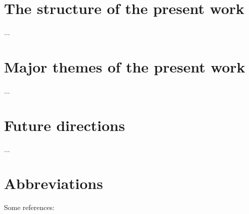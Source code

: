 \documentclass[output=paper]{langsci/langscibook}
\begin{document}
\section{The structure of the present work}\label{introstructure}
...

\section{Major themes of the present work}\label{introthemes}
...

\section{Future directions}\label{introfuture}
...

\section*{Abbreviations}

Some references:\\
\\
\citet{Jastrow2002}\\
\citet{Owens2000editor}\\
\citet{Watson2011dialectsoverview}



\sloppy
\printbibliography[heading=subbibliography,notkeyword=this] 
\end{document}
